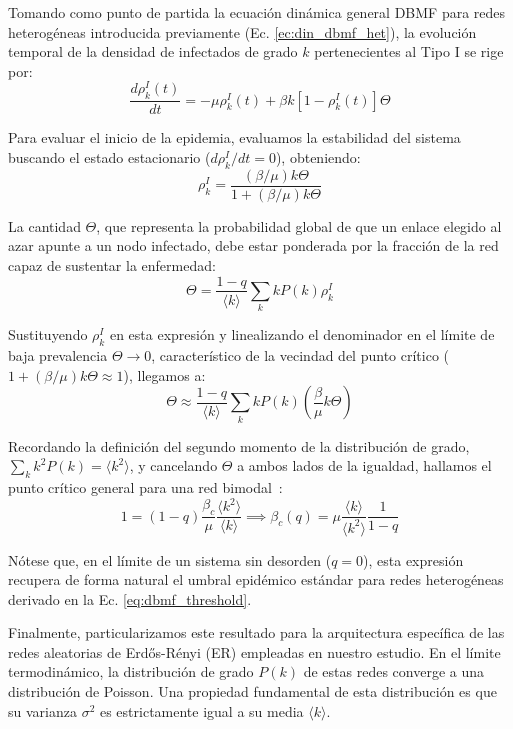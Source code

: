 \documentclass[%
reprint,
amsmath,amssymb,
aps,
]{revtex4-2}
\begin{document}
	Tomando como punto de partida la ecuación dinámica general DBMF para redes heterogéneas introducida previamente (Ec. \ref{ec:din_dbmf_het}), la evolución temporal de la densidad de infectados de grado $k$ pertenecientes al Tipo I se rige por:
	\begin{equation}
		\frac{d\rho_k^I(t)}{dt} = -\mu \rho_k^I(t) + \beta k [1 - \rho_k^I(t)] \Theta
	\end{equation}
	
	Para evaluar el inicio de la epidemia, evaluamos la estabilidad del sistema buscando el estado estacionario ($d\rho_k^I/dt = 0$), obteniendo:
	\begin{equation}
		\rho_k^I = \frac{(\beta/\mu) k \Theta}{1 + (\beta/\mu) k \Theta}
	\end{equation}
	
	La cantidad $\Theta$, que representa la probabilidad global de que un enlace elegido al azar apunte a un nodo infectado, debe estar ponderada por la fracción de la red capaz de sustentar la enfermedad:
	\begin{equation}
		\Theta = \frac{1-q}{\langle k \rangle} \sum_k k P(k) \rho_k^I
	\end{equation}
	
	Sustituyendo $\rho_k^I$ en esta expresión y linealizando el denominador en el límite de baja prevalencia $\Theta \to 0$, característico de la vecindad del punto crítico ($1 + (\beta/\mu) k \Theta \approx 1$), llegamos a:
	\begin{equation}
		\Theta \approx \frac{1-q}{\langle k \rangle} \sum_k k P(k) \left( \frac{\beta}{\mu} k \Theta \right)
	\end{equation}
	
	Recordando la definición del segundo momento de la distribución de grado, $\sum_k k^2 P(k) = \langle k^2 \rangle$, y cancelando $\Theta$ a ambos lados de la igualdad, hallamos el punto crítico general para una red bimodal~\cite{Muñoz2010,PastorSatorras2015}:
	\begin{equation}
		1 = (1-q) \frac{\beta_c}{\mu} \frac{\langle k^2 \rangle}{\langle k \rangle} \implies \beta_c(q) = \mu \frac{\langle k \rangle}{\langle k^2 \rangle} \frac{1}{1-q}
	\end{equation}
	
	Nótese que, en el límite de un sistema sin desorden ($q = 0$), esta expresión recupera de forma natural el umbral epidémico estándar para redes heterogéneas derivado en la Ec. \ref{eq:dbmf_threshold}. 
	
	Finalmente, particularizamos este resultado para la arquitectura específica de las redes aleatorias de Erdős-Rényi (ER) empleadas en nuestro estudio. En el límite termodinámico, la distribución de grado $P(k)$ de estas redes converge a una distribución de Poisson. Una propiedad fundamental de esta distribución es que su varianza $\sigma^2$ es estrictamente igual a su media $\langle k \rangle$.
	
\end{document}
